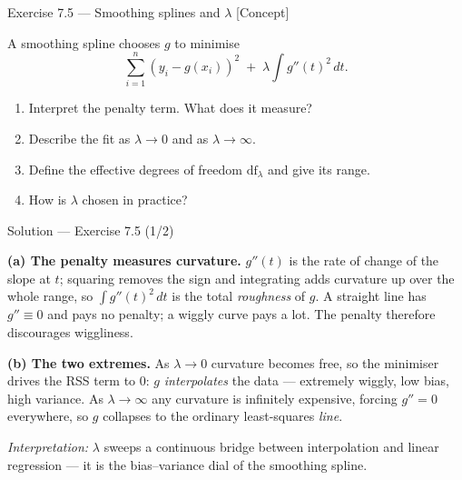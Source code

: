 \documentclass[aspectratio=169,11pt]{beamer}
\begin{document}
\begin{frame}{Exercise 7.5 --- Smoothing splines and $\lambda$ [Concept]}
\begin{exercise}
A smoothing spline chooses $g$ to minimise
\[ \sum_{i=1}^n (y_i-g(x_i))^2 \;+\; \lambda\!\int g''(t)^2\,dt. \]
\begin{enumerate}
  \item Interpret the penalty term. What does it measure?
  \item Describe the fit as $\lambda\to 0$ and as $\lambda\to\infty$.
  \item Define the effective degrees of freedom $\mathrm{df}_\lambda$ and give its range.
  \item How is $\lambda$ chosen in practice?
\end{enumerate}
\end{exercise}
\end{frame}

\begin{frame}{Solution --- Exercise 7.5 (1/2)}
\begin{solutionbox}
\textbf{(a) The penalty measures curvature.} $g''(t)$ is the rate of change of the slope at $t$; squaring removes the sign and integrating adds curvature up over the whole range, so $\int g''(t)^2\,dt$ is the total \emph{roughness} of $g$. A straight line has $g''\equiv0$ and pays no penalty; a wiggly curve pays a lot. The penalty therefore discourages wiggliness.

\medskip
\textbf{(b) The two extremes.} As $\lambda\to 0$ curvature becomes free, so the minimiser drives the RSS term to $0$: $g$ \emph{interpolates} the data --- extremely wiggly, low bias, high variance. As $\lambda\to\infty$ any curvature is infinitely expensive, forcing $g''=0$ everywhere, so $g$ collapses to the ordinary least-squares \emph{line}.

\medskip
\emph{Interpretation:} $\lambda$ sweeps a continuous bridge between interpolation and linear regression --- it is the bias--variance dial of the smoothing spline.
\end{solutionbox}
\end{frame}
\end{document}
